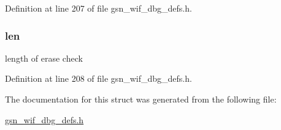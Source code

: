 Definition at line 207 of file gsn\_\-wif\_\-dbg\_\-defs.h.

\hypertarget{a00328_ab9abc6ede61238a05664f9c37e4412c3}{
\subsubsection[{len}]{ {\bf len}}}
\label{a00328_ab9abc6ede61238a05664f9c37e4412c3}
length of erase check 

Definition at line 208 of file gsn\_\-wif\_\-dbg\_\-defs.h.



The documentation for this struct was generated from the following file:\begin{DoxyCompactItemize}
\item 
\hyperlink{a00609}{gsn\_\-wif\_\-dbg\_\-defs.h}\end{DoxyCompactItemize}
